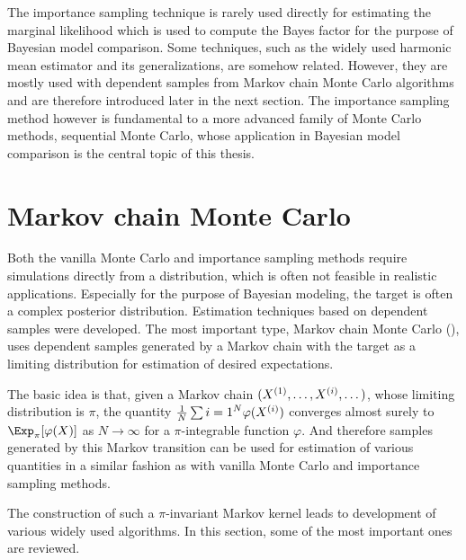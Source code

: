 The importance sampling technique is rarely used directly for estimating the
marginal likelihood which is used to compute the Bayes factor for the purpose
of Bayesian model comparison. Some techniques, such as the widely used
harmonic mean estimator and its generalizations, are somehow related. However,
they are mostly used with dependent samples from Markov chain Monte Carlo
algorithms and are therefore introduced later in the next section. The
importance sampling method however is fundamental to a more advanced family of
Monte Carlo methods, sequential Monte Carlo, whose application in Bayesian
model comparison is the central topic of this thesis.

\section{Markov chain Monte Carlo}
\label{sec:Markov chain Monte Carlo}

Both the vanilla Monte Carlo and importance sampling methods require
simulations directly from a distribution, which is often not feasible in
realistic applications. Especially for the purpose of Bayesian modeling, the
target is often a complex posterior distribution. Estimation techniques based
on dependent samples were developed. The most important type, Markov chain
Monte Carlo (\mcmc), uses dependent samples generated by a Markov chain with
the target as a limiting distribution for estimation of desired expectations.



The basic idea is that, given a Markov chain $(X^{(1)},\dots,X^{(i)},\dots)$,
whose limiting distribution is $\pi$, the quantity $\frac{1}{N}\sum{i=1}^N
\varphi(X^{(i)})$ converges almost surely to $\Exp_{\pi}[\varphi(X)]$ as
$N\to\infty$ for a $\pi$-integrable function $\varphi$. And therefore samples
generated by this Markov transition can be used for estimation of various
quantities in a similar fashion as with vanilla Monte Carlo and importance
sampling methods.

The construction of such a $\pi$-invariant Markov kernel leads to development
of various widely used \mcmc algorithms. In this section, some of the most
important ones are reviewed.

